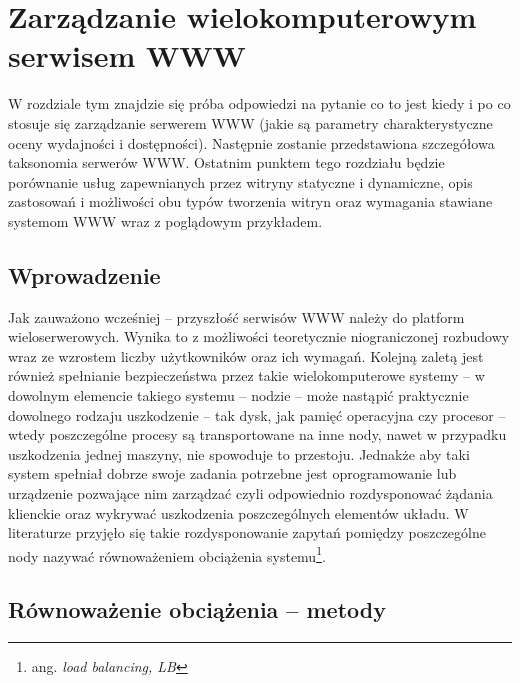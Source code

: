 \chapter{Zarządzanie wielokomputerowym serwisem WWW}
\label{r04}
W rozdziale tym znajdzie się próba odpowiedzi na pytanie co to jest kiedy i po co stosuje się zarządzanie serwerem 
WWW (jakie są parametry charakterystyczne oceny wydajności i dostępności). Następnie zostanie przedstawiona szczegółowa 
taksonomia serwerów WWW. Ostatnim punktem tego rozdziału 
będzie porównanie usług zapewnianych przez witryny statyczne i dynamiczne, opis zastosowań i możliwości obu 
typów tworzenia witryn oraz wymagania stawiane systemom WWW wraz z poglądowym przykładem.

\section{Wprowadzenie}

Jak zauważono wcześniej -- przyszłość serwisów WWW należy do platform wieloserwerowych. Wynika to z możliwości 
teoretycznie niograniczonej rozbudowy wraz ze wzrostem liczby użytkowników oraz ich wymagań. Kolejną zaletą jest 
również spełnianie bezpieczeństwa przez takie wielokomputerowe systemy -- w dowolnym elemencie takiego systemu -- nodzie --
może nastąpić praktycznie dowolnego rodzaju uszkodzenie -- tak dysk, jak pamięć operacyjna czy procesor -- wtedy poszczególne
procesy są transportowane na inne nody, nawet w przypadku uszkodzenia jednej maszyny, nie spowoduje to przestoju. Jednakże aby
taki system spełniał dobrze swoje zadania potrzebne jest oprogramowanie lub urządzenie pozwające nim zarządzać czyli 
odpowiednio rozdysponować żądania klienckie oraz wykrywać uszkodzenia poszczególnych elementów układu. W literaturze
przyjęło się takie rozdysponowanie zapytań pomiędzy poszczególne nody nazywać równoważeniem obciążenia systemu\footnote{ang. 
\emph{load balancing, LB}}. 

\section{Równoważenie obciążenia -- metody}

